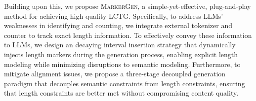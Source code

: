 Building upon this, we propose \textsc{MarkerGen}, a simple-yet-effective, plug-and-play method for achieving high-quality LCTG.
Specifically, to address LLMs' weaknesses in identifying and counting, we integrate external tokenizer and counter to track exact length information. To effectively convey these information to LLMs, we design an decaying interval insertion strategy that dynamically injects length markers during the generation process, enabling explicit length modeling while minimizing disruptions to semantic modeling.
Furthermore, to mitigate alignment issues, we propose a three-stage decoupled generation paradigm that decouples semantic constraints from length constraints, ensuring that length constraints are better met without compromising content quality.





